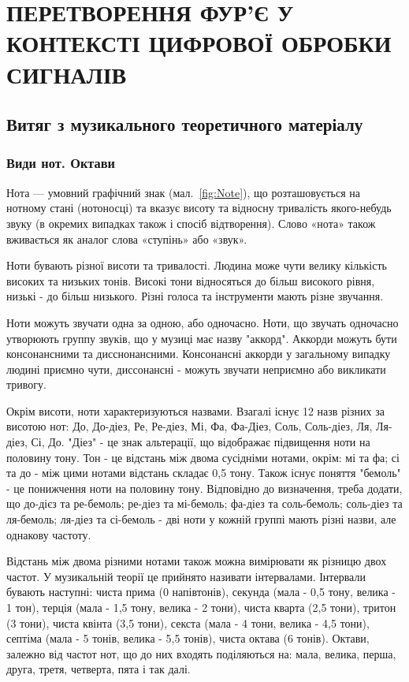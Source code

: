 \section{ПЕРЕТВОРЕННЯ ФУР'Є У КОНТЕКСТІ ЦИФРОВОЇ ОБРОБКИ СИГНАЛІВ}

\subsection{Витяг з музикального теоретичного матеріалу}

\subsubsection{Види нот. Октави}


Нота — умовний графічний знак (мал.~\ref{fig:Note}), що розташовується на нотному стані (нотоносці) та вказує висоту та відносну тривалість якого-небудь звуку (в окремих випадках також і спосіб відтворення). Слово «нота» також вживається як аналог слова «ступінь» або «звук».

Ноти бувають різної висоти та тривалості. Людина може чути велику кількість високих та низьких тонів. Високі тони відносяться до більш високого рівня, низькі - до більш низького. Різні голоса та інструменти мають різне звучання. 

Ноти можуть звучати одна за одною, або одночасно. Ноти, що звучать одночасно утворюють группу звуків, що у музиці має назву "аккорд". Аккорди можуть бути консонансними та дисснонансними. Консонансні аккорди у загальному випадку людині приємно чути, диссонансні - можуть звучати неприємно або викликати тривогу. 

Окрім висоти, ноти характеризуються назвами. Взагалі існує 12 назв різних за висотою нот: До, До-діез, Ре, Ре-діез, Мі, Фа, Фа-Діез, Соль, Соль-діез, Ля, Ля-діез, Сі, До. "Діез" - це знак альтерації, що відображає підвищення ноти на половину тону. Тон - це відстань між двома сусідніми нотами, окрім: мі та фа; сі та до - між цими нотами відстань складає 0,5 тону. Також існує поняття "бемоль" - це понижчення ноти на половину тону. Відповідно до визначення, треба додати, що до-дієз та ре-бемоль; ре-діез та мі-бемоль; фа-діез та соль-бемоль; соль-діез та ля-бемоль; ля-діез та сі-бемоль - дві ноти у кожній группі мають різні назви, але однакову частоту.

\label{octaves-info}
Відстань між двома різними нотами також можна вимірювати як різницю двох частот. У музикальній теорії це прийнято називати інтервалами. Інтервали бувають наступні: чиста прима (0 напівтонів), секунда (мала - 0,5 тону, велика - 1 тон), терція (мала - 1,5 тону, велика - 2 тони), чиста кварта (2,5 тони), тритон (3 тони), чиста квінта (3,5 тони), секста (мала - 4 тони, велика - 4,5 тони), септіма (мала - 5 тонів, велика - 5,5 тонів), чиста октава (6 тонів).  Октави, залежно від частот нот, що до них входять поділяються на: мала, велика, перша, друга, третя, четверта, пята і так далі.

